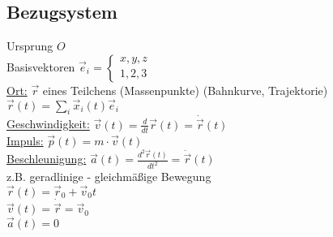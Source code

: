 \documentclass[titlepage,12pt,a4paper,ngerman]{report}
\begin{document}
\subsection{Bezugsystem}
Ursprung $O$\\
Basisvektoren $\vec{e}_{i}= \left\{\begin{array}{ll} x,y,z \\1,2,3\end{array}\right. $ \\	
\underline{Ort:} $\vec{r}$ eines Teilchens (Massenpunkte) (Bahnkurve, Trajektorie)\\
$\vec{r}(t) = \sum_{i} \vec{x}_{i}(t)\vec{e}_{i}$\\
\underline{Geschwindigkeit:} $\vec{v}(t) = \frac{d}{dt} \vec{r}(t) = \dot{\vec{r}}(t)$\\
\underline{Impuls:} $ \vec{p}(t) = m\cdot \vec{v}(t)$\\
\underline{Beschleunigung:} $\vec{a}(t) = \frac{d^{2}\vec{r}(t)}{dt^{2}} = \ddot{\vec{r}} (t)$\\
z.B. geradlinige - gleichmäßige Bewegung\\
$\vec{r}(t) = \vec{r}_{0} + \vec{v}_{0} t$\\
$\vec{v}(t) = \dot{\vec{r}}  = \vec{v}_{0}$\\
$\vec{a}(t) = 0$
\end{document}
